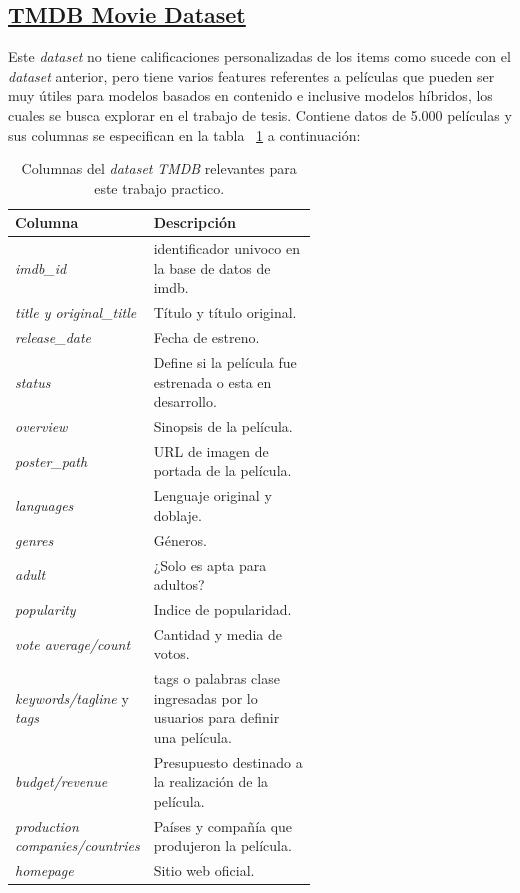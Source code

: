 \documentclass[11pt,a4paper,twoside]{thesis}
\begin{document}
\subsection{\href{https://www.kaggle.com/datasets/rounakbanik/the-movies-dataset?select=movies_metadata.csv}{TMDB Movie Dataset}}

Este \textit{dataset} no tiene calificaciones personalizadas de los items como sucede con el \textit{dataset} anterior, 
pero tiene varios features referentes a películas que pueden ser muy útiles para modelos basados en contenido e inclusive
modelos híbridos, los cuales se busca explorar en el trabajo de tesis. Contiene datos de 5.000 películas y sus columnas se especifican en la tabla ~\ref{table:tmdbColumns} a continuación:


\begin{table}[!htb]
	\centering
	\footnotesize
	\begin{tabular}{l | p{0.6\linewidth}}
	\hline
		Columna                      & Descripción \\
	\hline
	\textit{imdb\_id}                & identificador univoco en la base de datos de imdb. \\
	\textit{title y original\_title} & Título y título original. \\
	\textit{release\_date}           & Fecha de estreno. \\
	\textit{status}                  & Define si la película fue estrenada o esta en desarrollo. \\
	\textit{overview}                & Sinopsis de la película. \\
	\textit{poster\_path}            & URL de imagen de portada de la película. \\ 
	\textit{languages}               & Lenguaje original y doblaje. \\
	\textit{genres}                  & Géneros. \\
	\textit{adult}                   & ¿Solo es apta para adultos? \\
	\textit{popularity}              & Indice de popularidad. \\
	\textit{vote average/count}      & Cantidad y media de votos. \\
	\textit{keywords/tagline} y \textit{tags} & tags o palabras clase ingresadas por lo usuarios para definir una película. \\
	\textit{budget/revenue}                   & Presupuesto destinado a la realización de la película. \\
	\textit{production companies/countries}   & Países y compañía que produjeron la película. \\ 
	\textit{homepage}                         & Sitio web oficial. \\

	\hline
	\end{tabular}
	\caption{
		Columnas del \textit{dataset} \textit{TMDB} relevantes para este trabajo practico.
	}
	\label{table:tmdbColumns}
\end{table}
\end{document}
